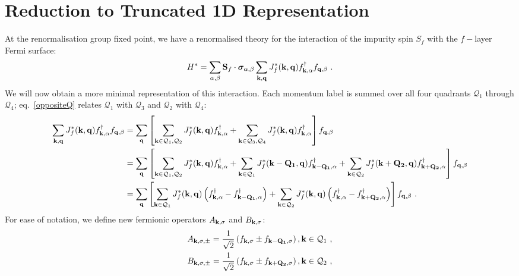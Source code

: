 \documentclass[%
reprint,
superscriptaddress,
groupedaddress,
superscriptaddress,
onecolumn,
]{revtex4-2}
\begin{document}
\section{Reduction to Truncated 1D Representation}
At the renormalisation group fixed point, we have a renormalised theory for the interaction of the impurity spin \(S_f\) with the \(f-\)layer Fermi surface:
\begin{equation}\begin{aligned}
	H^* = \sum_{\alpha,\beta}{\bf S}_f\cdot{\boldsymbol\sigma}_{\alpha,\beta}\sum_{{\bf k}, {\bf q}} J_f^*({\bf k},{\bf q}) f^\dagger_{{\bf k},\alpha}f_{{\bf q},\beta}~.
\end{aligned}\end{equation}
We will now obtain a more minimal representation of this interaction. Each momentum label is summed over all four quadrants \(\mathcal{Q}_1\) through \(\mathcal{Q}_4\); eq.~\ref{oppositeQ} relates \(\mathcal{Q}_1\) with \(\mathcal{Q}_3\) and \(\mathcal{Q}_2\) with \(\mathcal{Q}_4\):
\begin{equation}\begin{aligned}
	\sum_{{\bf k}, {\bf q}} J_f^*({\bf k},{\bf q}) f^\dagger_{{\bf k},\alpha}f_{{\bf q},\beta} 
	&= \sum_{\bf q}\left[\sum_{{\bf k} \in \mathcal{Q}_1,\mathcal{Q}_2} J_f^*({\bf k},{\bf q}) f^\dagger_{{\bf k},\alpha} + \sum_{{\bf k} \in \mathcal{Q}_3,\mathcal{Q}_4} J_f^*({\bf k},{\bf q}) f^\dagger_{{\bf k},\alpha}\right] f_{{\bf q},\beta}\\
	&= \sum_{\bf q}\left[\sum_{{\bf k} \in \mathcal{Q}_1,\mathcal{Q}_2} J_f^*({\bf k},{\bf q}) f^\dagger_{{\bf k},\alpha} + \sum_{{\bf k} \in \mathcal{Q}_1} J_f^*({\bf k - Q_1},{\bf q}) f^\dagger_{{\bf k - Q_1},\alpha} + \sum_{{\bf k} \in \mathcal{Q}_2} J_f^*({\bf k + Q_2},{\bf q}) f^\dagger_{{\bf k + Q_2},\alpha}\right] f_{{\bf q},\beta}\\
	&= \sum_{\bf q}\left[\sum_{{\bf k} \in \mathcal{Q}_1} J_f^*({\bf k},{\bf q}) \left(f^\dagger_{{\bf k},\alpha} - f^\dagger_{{\bf k - Q_1},\alpha}\right) + \sum_{{\bf k} \in \mathcal{Q}_2} J_f^*({\bf k},{\bf q}) \left(f^\dagger_{{\bf k},\alpha} - f^\dagger_{{\bf k + Q_2},\alpha}\right) \right] f_{{\bf q},\beta}~.
\end{aligned}\end{equation}
For ease of notation, we define new fermionic operators \(A_{{\bf k},\sigma}\) and \(B_{{\bf k},\sigma}\):
\begin{equation}\begin{aligned}\label{defineA}
	A_{{\bf k},\sigma,\pm} = \frac{1}{\sqrt{2}}\left(f_{{\bf k},\sigma} \pm f_{{\bf k - Q_1},\sigma}\right), {\bf k}\in\mathcal{Q}_1~,\\
	B_{{\bf k},\sigma,\pm} = \frac{1}{\sqrt{2}}\left(f_{{\bf k},\sigma} \pm f_{{\bf k + Q_2},\sigma}\right), {\bf k}\in\mathcal{Q}_2~,
\end{aligned}\end{equation}
\end{document}
